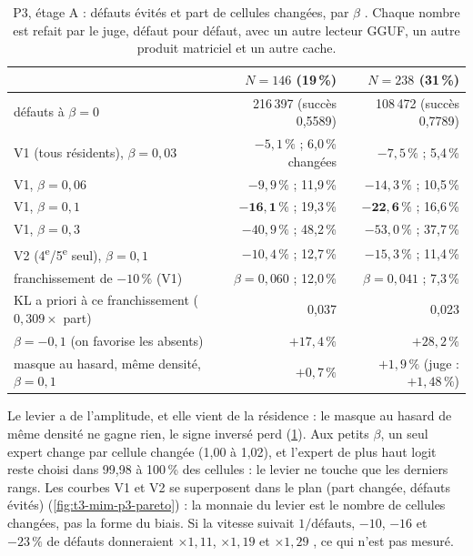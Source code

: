 \begin{table}[tbp]
\centering\small
\caption[P3, étage A : défauts évités et cellules changées]{P3, étage A : défauts évités et part de cellules changées, par $\beta$ \mes. Chaque nombre est refait par le juge, défaut pour défaut, avec un autre lecteur GGUF, un autre produit matriciel et un autre cache.}
\label{t3mim:tab:p3-A}
\begin{tabular}{@{}lrr@{}}
\toprule
& $N = 146$ (19\,\%) & $N = 238$ (31\,\%) \\
\midrule
défauts à $\beta = 0$ & 216\,397 (succès 0,5589) & 108\,472 (succès 0,7789) \\
V1 (tous résidents), $\beta = 0{,}03$ & $-5{,}1\,\%$ ; 6,0\,\% changées & $-7{,}5\,\%$ ; 5,4\,\% \\
V1, $\beta = 0{,}06$ & $-9{,}9\,\%$ ; 11,9\,\% & $-14{,}3\,\%$ ; 10,5\,\% \\
V1, $\beta = 0{,}1$ & $\mathbf{-16{,}1\,\%}$ ; 19,3\,\% & $\mathbf{-22{,}6\,\%}$ ; 16,6\,\% \\
V1, $\beta = 0{,}3$ & $-40{,}9\,\%$ ; 48,2\,\% & $-53{,}0\,\%$ ; 37,7\,\% \\
V2 (4\textsuperscript{e}/5\textsuperscript{e} seul), $\beta = 0{,}1$ & $-10{,}4\,\%$ ; 12,7\,\% & $-15{,}3\,\%$ ; 11,4\,\% \\
franchissement de $-10\,\%$ (V1) & $\beta = 0{,}060$ ; 12,0\,\% & $\beta = 0{,}041$ ; 7,3\,\% \\
KL a priori à ce franchissement ($0{,}309 \times$ part) & 0,037 & 0,023 \\
$\beta = -0{,}1$ (on favorise les absents) & $+17{,}4\,\%$ & $+28{,}2\,\%$ \\
masque au hasard, même densité, $\beta = 0{,}1$ & $+0{,}7\,\%$ & $+1{,}9\,\%$ (juge : $+1{,}48\,\%$) \\
\bottomrule
\end{tabular}
\end{table}

Le levier a de l'amplitude, et elle vient de la résidence : le masque au hasard de même densité ne gagne rien, le signe inversé perd (\cref{t3mim:tab:p3-A}). Aux petits $\beta$, un seul expert change par cellule changée (1,00 à 1,02), et l'expert de plus haut logit reste choisi dans 99,98 à 100\,\% des cellules : le levier ne touche que les derniers rangs. Les courbes V1 et V2 se superposent dans le plan (part changée, défauts évités) (\cref{fig:t3-mim-p3-pareto}) : la monnaie du levier est le nombre de cellules changées, pas la forme du biais. Si la vitesse suivait $1/\text{défauts}$, $-10$, $-16$ et $-23\,\%$ de défauts donneraient $\times 1{,}11$, $\times 1{,}19$ et $\times 1{,}29$ \calc, ce qui n'est pas mesuré.

